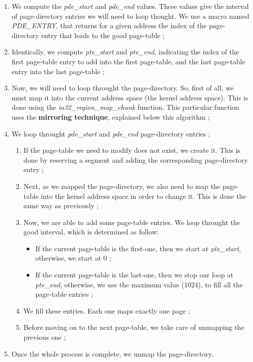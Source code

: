 \begin{enumerate}
\item We compute the \textit{pde\_start} and \textit{pde\_end}
values. These values give the interval of page-directory entries we
will need to loop thought. We use a macro named \textit{PDE\_ENTRY},
that returns for a given address the index of the page-directory entry
that leads to the good page-table ;
\item Identically, we compute \textit{pte\_start} and
\textit{pte\_end}, indicating the index of the first page-table entry
to add into the first page-table, and the last page-table entry into
the last page-table ;
\item Now, we will need to loop throught the page-directory. So, first
of all, we must map it into the current address space (the kernel
address space). This is done using the
\textit{ia32\_region\_map\_chunk} function. This particular function
uses the \textbf{mirroring technique}, explained below this algorithm ;
\item We loop throught \textit{pde\_start} and \textit{pde\_end}
page-directory entries ;
  \begin{enumerate}
  \item If the page-table we need to modify does not exist, we create
  it. This is done by reserving a segment and adding the corresponding
  page-directory entry ;
  \item Next, as we mapped the page-directory, we also need to map the
  page-table into the kernel address space in order to change it. This
  is done the same way as previously ;
  \item Now, we are able to add some page-table entries. We loop
  throught the good interval, which is determined as follow:
    \begin{itemize}
    \item If the current page-table is the first-one, then we start at
    \textit{pte\_start}, otherwise, we start at 0 ;
    \item If the current page-table is the last-one, then we stop our
    loop at \textit{pte\_end}, otherwise, we use the maximum value
    (1024), to fill all the page-table entries ;
    \end{itemize}
    \item We fill these entries. Each one maps exactly one page ;
    \item Before moving on to the next page-table, we take care of
    unmapping the previous one ;
  \end{enumerate}
\item Once the whole process is complete, we unmap the page-directory.
\end{enumerate}

